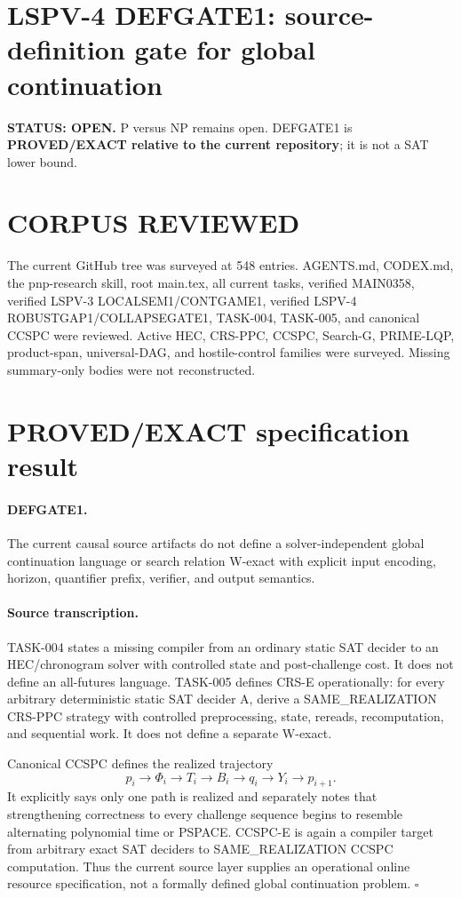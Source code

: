 \documentclass[11pt]{article}
\begin{document}
\section*{LSPV-4 DEFGATE1: source-definition gate for global continuation}
\textbf{STATUS: OPEN.} P versus NP remains open. DEFGATE1 is \textbf{PROVED/EXACT relative to the current repository}; it is not a SAT lower bound.

\section*{CORPUS REVIEWED}
The current GitHub tree was surveyed at 548 entries. AGENTS.md, CODEX.md, the pnp-research skill, root main.tex, all current tasks, verified MAIN0358, verified LSPV-3 LOCALSEM1/CONTGAME1, verified LSPV-4 ROBUSTGAP1/COLLAPSEGATE1, TASK-004, TASK-005, and canonical CCSPC were reviewed. Active HEC, CRS-PPC, CCSPC, Search-G, PRIME-LQP, product-span, universal-DAG, and hostile-control families were surveyed. Missing summary-only bodies were not reconstructed.

\section*{PROVED/EXACT specification result}
\paragraph{DEFGATE1.}
The current causal source artifacts do not define a solver-independent global continuation language or search relation W-exact with explicit input encoding, horizon, quantifier prefix, verifier, and output semantics.

\paragraph{Source transcription.}
TASK-004 states a missing compiler from an ordinary static SAT decider to an HEC/chronogram solver with controlled state and post-challenge cost. It does not define an all-futures language. TASK-005 defines CRS-E operationally: for every arbitrary deterministic static SAT decider A, derive a SAME\_REALIZATION CRS-PPC strategy with controlled preprocessing, state, rereads, recomputation, and sequential work. It does not define a separate W-exact.

Canonical CCSPC defines the realized trajectory
\[
p_i\to\Phi_i\to T_i\to B_i\to q_i\to Y_i\to p_{i+1}.
\]
It explicitly says only one path is realized and separately notes that strengthening correctness to every challenge sequence begins to resemble alternating polynomial time or PSPACE. CCSPC-E is again a compiler target from arbitrary exact SAT deciders to SAME\_REALIZATION CCSPC computation. Thus the current source layer supplies an operational online resource specification, not a formally defined global continuation problem. \(\square\)
\end{document}
